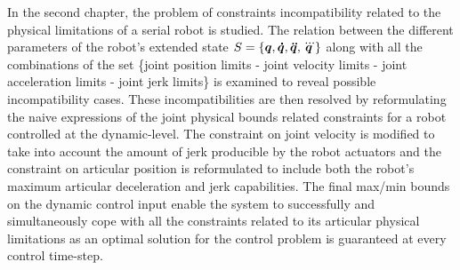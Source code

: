 In the second chapter, the problem of constraints incompatibility related to the physical limitations of a serial robot is studied. 
The relation between the different parameters of the robot's extended state $S=\{\mbox{\boldmath${q}$}, \mbox{\boldmath${\dot{q}}$}, \mbox{\boldmath${\ddot{q}}$}, \mbox{\boldmath${\dddot{q}}$}\}$ along with all the combinations of the set \{joint position limits - joint velocity limits - joint acceleration limits - joint jerk limits\} is examined to reveal possible incompatibility cases. These incompatibilities are then resolved by reformulating the naive expressions of the joint physical bounds related constraints for a robot controlled at the dynamic-level. The constraint on joint velocity is modified to take into account the amount of jerk producible by the robot actuators and the constraint on articular position is reformulated to include both the robot's maximum articular deceleration and jerk capabilities. The final max/min bounds on the dynamic control input enable the system to successfully and simultaneously cope with all the constraints related to its articular physical limitations as an optimal solution for the control problem is guaranteed at every control time-step. 

